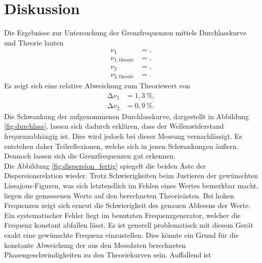 \section{Diskussion}
\label{sec:Diskussion}

Die Ergebnisse zur Untersuchung der Grenzfrequenzen mittels Durchlasskurve und Theorie lauten
\begin{align*}
  \nu_{1} &= , \\
  \nu_{1, \text{theorie}} &= , \\
  \nu_{2} &= , \\
  \nu_{2, \text{theorie}} &= .
\end{align*}
Es zeigt sich eine relative Abweichung zum Theoriewert von
\begin{align*}
  \increment\nu_{1} &= 1,3\:\%, \\
  \increment\nu_{2} &= 0,9\:\%.
\end{align*}
Die Schwankung der aufgenommenen Durchlasskurve, dargestellt in Abbildung \ref{fig:durchlass}, lassen sich dadurch erklären, dass der Wellenwiderstand frequenzabhängig ist.
Dies wird jedoch bei dieser Messung vernachlässigt.
Es entstehen daher Teilreflexionen, welche sich in jenen Schwankungen äußern.
Dennoch lassen sich die Grenzfrequenzen gut erkennen.\\
Die Abbildung \ref{fig:dispersion_fertig} spiegelt die beiden Äste der Dispersionsrelation wieder.
Trotz Schwierigkeiten beim Justieren der gewünschten Lissajous-Figuren, was sich letztendlich im Fehlen eines Wertes bemerkbar macht, liegen die gemessenen Werte auf den berechneten Theorieästen.
Bei hohen Frequenzen zeigt sich erneut die Schwierigkeit des genauen Ablesens der Werte.\\
Ein systematischer Fehler liegt im benutzten Frequenzgenerator, welcher die Frequenz konstant abfallen lässt.
Es ist generell problematisch mit diesem Gerät exakt eine gewünschte Frequenz einzustellen.
Dies könnte ein Grund für die konstante Abweichung der aus den Messdaten berechneten Phasengeschwindigkeiten zu den Theoriekurven sein.
Auffallend ist



%
%
%
%
%
